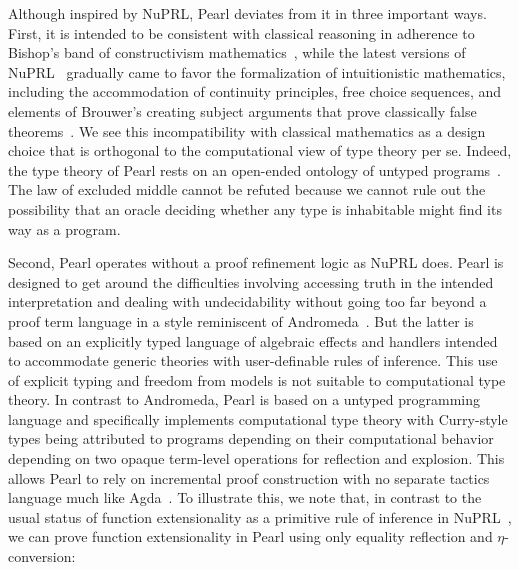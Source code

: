 \documentclass[a4paper]{article}
\begin{document}

Although inspired by NuPRL, Pearl deviates from it in three important ways. First, it is intended to be consistent with classical reasoning in adherence to Bishop's band of constructivism mathematics~\cite{bishop1967foundations}, while the latest versions of NuPRL~\cite{rahli2017bar, bickford2018computability, constable2020continuum} gradually came to favor the formalization of intuitionistic mathematics, including the accommodation of continuity principles, free choice sequences, and elements of Brouwer's creating subject arguments that prove classically false theorems~\cite{bentzen2025iep}. We see this incompatibility with classical mathematics as a design choice that is orthogonal to the computational view of type theory per se. Indeed, the type theory of Pearl rests on an open-ended ontology of untyped programs~\cite[ \S11]{bentzen2026book}. The law of excluded middle cannot be refuted because we cannot rule out the possibility that an oracle deciding whether any type is inhabitable might find its way as a program. 

Second, Pearl operates without a proof refinement logic as NuPRL does. Pearl is designed to get around the difficulties involving accessing truth in the intended interpretation and dealing with undecidability without going too far beyond a proof term language in a style reminiscent of Andromeda~\cite{bauer2018design}. But the latter is based on an explicitly typed language of algebraic effects and handlers intended to accommodate generic theories with user-definable rules of inference. This use of explicit typing and freedom from models is not suitable to computational type theory. In contrast to Andromeda, Pearl is based on a untyped programming language and specifically implements computational type theory with Curry-style types being attributed to programs depending on their computational behavior depending on two opaque term-level operations for reflection and explosion. This allows Pearl to rely on incremental proof construction with no separate tactics language much like Agda~\cite{norell2009agda}. 
To illustrate this, we note that, in contrast to the usual status of function extensionality as a primitive rule of inference in NuPRL~\cites[p.~179]{nuprl}[A.3.1]{kreitz2002nuprl}, we can prove function extensionality in Pearl using only equality reflection and $\eta$-conversion:

\end{document}
